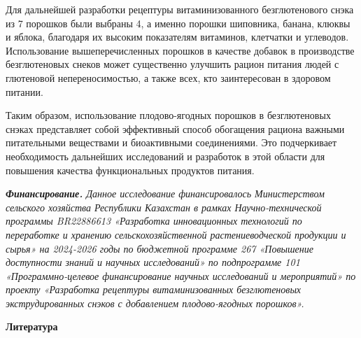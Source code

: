 \begin{multicols}{2}
Для дальнейшей разработки рецептуры витаминизованного безглютенового
снэка из 7 порошков были выбраны 4, а именно порошки шиповника, банана,
клюквы и яблока, благодаря их высоким показателям витаминов, клетчатки и
углеводов. Использование вышеперечисленных порошков в качестве добавок в
производстве безглютеновых снеков может существенно улучшить рацион
питания людей с глютеновой непереносимостью, а также всех, кто
заинтересован в здоровом питании.

Таким образом, использование плодово-ягодных порошков в безглютеновых
снэках представляет собой эффективный способ обогащения рациона важными
питательными веществами и биоактивными соединениями. Это подчеркивает
необходимость дальнейших исследований и разработок в этой области для
повышения качества функциональных продуктов питания.

\emph{{\bfseries Финансирование.} Данное исследование финансировалось
Министерством сельского хозяйства Республики Казахстан в рамках
Научно-технической программы BR22886613 «Разработка инновационных
технологий по переработке и хранению сельскохозяйственной
растениеводческой продукции и сырья» на 2024-2026 годы по бюджетной
программе 267 «Повышение доступности знаний и научных исследований» по
подпрограмме 101 «Программно-целевое финансирование научных исследований
и мероприятий» по проекту «Разработка рецептуры витаминизованных
безглютеновых экструдированных снэков с добавлением плодово-ягодных
порошков».}
\end{multicols}

\begin{center}
{\bfseries Литература}
\end{center}

